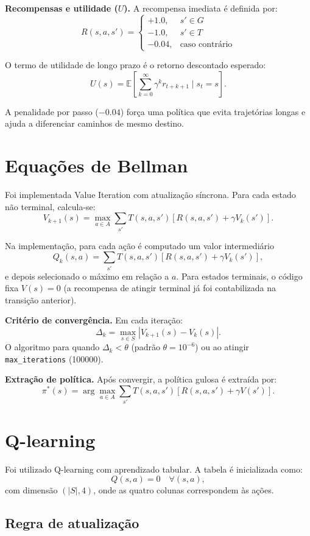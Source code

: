 \documentclass[a4paper,11pt]{article}
\begin{document}
\textbf{Recompensas e utilidade ($U$).} A recompensa imediata é definida por:
\[
R(s,a,s')=
\begin{cases}
+1.0, & s'\in G \\
-1.0, & s'\in T \\
-0.04, & \text{caso contrário}
\end{cases}
\]

O termo de utilidade de longo prazo é o retorno descontado esperado:
\[
U(s)=\mathbb{E}\left[\sum_{k=0}^{\infty}\gamma^k r_{t+k+1}\mid s_t=s\right].
\]

A penalidade por passo ($-0.04$) força uma política que evita trajetórias longas e ajuda a diferenciar caminhos de mesmo destino.

\section{Equações de Bellman}

Foi implementada Value Iteration com atualização síncrona. Para cada estado não terminal, calcula-se:
\[
V_{k+1}(s)=\max_{a\in A}\sum_{s'} T(s,a,s')\left[R(s,a,s')+\gamma V_k(s')\right].
\]

Na implementação, para cada ação é computado um valor intermediário
\[
Q_k(s,a)=\sum_{s'} T(s,a,s')\left[R(s,a,s')+\gamma V_k(s')\right],
\]
e depois selecionado o máximo em relação a $a$. Para estados terminais, o código fixa $V(s)=0$ (a recompensa de atingir terminal já foi contabilizada na transição anterior).

\textbf{Critério de convergência.} Em cada iteração:
\[
\Delta_k=\max_{s\in S}|V_{k+1}(s)-V_k(s)|.
\]
O algoritmo para quando $\Delta_k<\theta$ (padrão $\theta=10^{-6}$) ou ao atingir \texttt{max\_iterations} (100000).

\textbf{Extração de política.} Após convergir, a política gulosa é extraída por:
\[
\pi^*(s)=\arg\max_{a\in A}\sum_{s'} T(s,a,s')\left[R(s,a,s')+\gamma V(s')\right].
\]

\section{Q-learning}

Foi utilizado Q-learning com aprendizado tabular. A tabela é inicializada como:
\[
Q(s,a)=0\quad \forall (s,a),
\]
com dimensão $(|S|,4)$, onde as quatro colunas correspondem às ações.

\subsection*{Regra de atualização}
\end{document}
